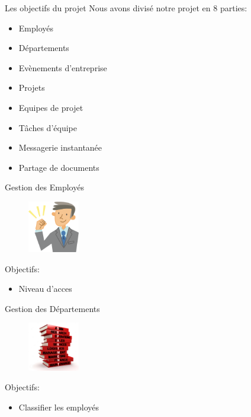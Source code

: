 \begin{frame}{Les objectifs du projet}
 Nous avons divisé notre projet en 8 parties:
  \begin{itemize}
  \item Employés
\item Départements
 \item Evènements d'entreprise
 \item Projets
 \item Equipes de projet
 \item Tâches d'équipe
  \item Messagerie instantanée
\item Partage de documents
    \end{itemize}
\end{frame}

\begin{frame}{Gestion des Employés}
\begin{figure}[h!]
  \includegraphics[width=0.2\textwidth]{images/employee}
\end{figure}
Objectifs:
  \begin{itemize}
    \item Niveau d'acces
  \end{itemize}
\end{frame}

\begin{frame}{Gestion des Départements}
\begin{figure}[h!]
  \includegraphics[width=0.2\textwidth]{images/department}
\end{figure}
Objectifs:
  \begin{itemize}
    \item Classifier les employés
  \end{itemize}
\end{frame}

